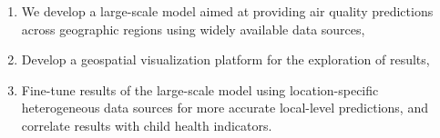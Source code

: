 \begin{enumerate}
    \item We develop a large-scale model aimed at providing air quality predictions across geographic regions using widely available data sources,
    \item Develop a geospatial visualization platform for the exploration of results,
    \item Fine-tune results of the large-scale model using location-specific heterogeneous data sources for more accurate local-level predictions, and correlate results with child health indicators.
\end{enumerate}

